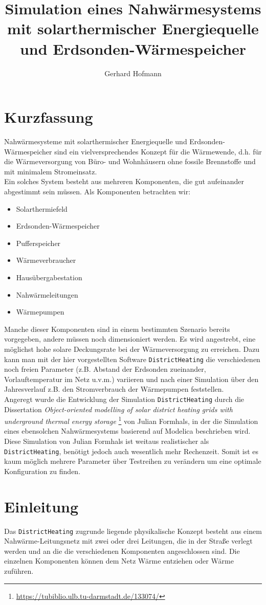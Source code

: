 \documentclass[12pt,a4paper]{article}
\author{Gerhard Hofmann}
\title{Simulation eines Nahwärmesystems mit solarthermischer Energiequelle und Erdsonden-Wärmespeicher}
\begin{document}
\maketitle
\tableofcontents
\section{Kurzfassung}
Nahwärmesysteme mit solarthermischer Energiequelle und Erdsonden-Wärmespeicher sind ein vielversprechendes Konzept für die Wärmewende, d.h. für die Wärmeversorgung von Büro- und Wohnhäusern ohne fossile Brennstoffe und mit minimalem Stromeinsatz.\\
Ein solches System besteht aus mehreren Komponenten, die gut aufeinander abgestimmt sein müssen. Als Komponenten betrachten wir:\begin{itemize}
\item Solarthermiefeld
\item Erdsonden-Wärmespeicher
\item Pufferspeicher
\item Wärmeverbraucher
\item Hausübergabestation
\item Nahwärmeleitungen
\item Wärmepumpen
\end{itemize}
Manche dieser Komponenten sind in einem bestimmten Szenario bereits vorgegeben, andere müssen noch dimensioniert werden. 
Es wird angestrebt, eine möglichst hohe solare Deckungsrate bei der Wärmeversorgung zu erreichen. Dazu kann man mit der hier vorgestellten Software \texttt{DistrictHeating} die verschiedenen noch freien Parameter (z.B. Abstand der Erdsonden zueinander, Vorlauftemperatur im Netz u.v.m.) variieren und nach einer Simulation über den Jahresverlauf z.B. den Stromverbrauch der Wärmepumpen feststellen.\\
Angeregt wurde die Entwicklung der Simulation \texttt{DistrictHeating} durch die Dissertation \emph{\glqq Object-oriented modelling of solar district heating grids with underground thermal energy storage\grqq} \footnote{\url{https://tubiblio.ulb.tu-darmstadt.de/133074/}} von Julian Formhals, in der die Simulation eines ebensolchen Nahwärmesystems basierend auf Modelica beschrieben wird. Diese Simulation von Julian Formhals ist weitaus realistischer als \texttt{DistrictHeating}, benötigt jedoch auch wesentlich mehr Rechenzeit. Somit ist es kaum möglich mehrere Parameter über Testreihen zu verändern um eine optimale Konfiguration zu finden.
\section{Einleitung}
Das \texttt{DistrictHeating} zugrunde liegende physikalische Konzept besteht aus einem Nahwärme-Leitungsnetz mit zwei oder drei Leitungen, die in der Straße verlegt werden und an die die verschiedenen Komponenten angeschlossen sind. Die einzelnen Komponenten können dem Netz Wärme entziehen oder Wärme zuführen.
\end{document}

